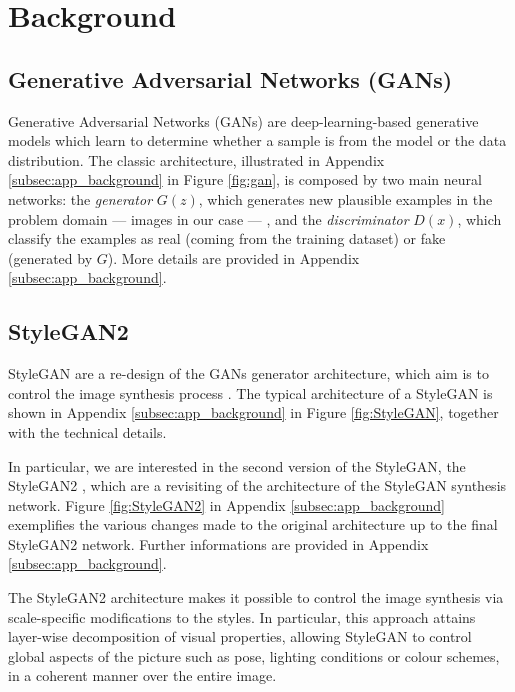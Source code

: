 \documentclass{article}
\begin{document}
	\section{Background}	
	
	\subsection{Generative Adversarial Networks (GANs)}\label{sec:gan}
	Generative Adversarial Networks (GANs) \cite{goodfellow2014generative} are deep-learning-based 
	generative models which learn to determine whether a sample is from the model or the data 
	distribution. 
	The classic architecture, illustrated in Appendix \ref{subsec:app_background} in Figure 
	\ref{fig:gan}, is 
	composed by two main neural networks: 
	the \textit{generator} ${G(z)}$, which generates new plausible examples in the problem domain — 
	images in our case — , and the \textit{discriminator} ${D(x)}$, which classify the examples as 
	real (coming from the training dataset) or fake (generated by $G$). More details are provided in 
	Appendix \ref{subsec:app_background}.
	
	\subsection{StyleGAN2}\label{sec:StyleGAN}
	StyleGAN are a re-design of the GANs generator architecture, which aim is to control the image 
	synthesis process \cite{karras2019style}. The typical architecture of a StyleGAN is shown in 
	Appendix \ref{subsec:app_background} in Figure \ref{fig:StyleGAN}, together with the technical 
	details. 
	
	In particular, we are interested in the second version of the StyleGAN, the StyleGAN2 
	\cite{karras2020analyzing}, which are a revisiting of the architecture of the StyleGAN synthesis 
	network. Figure \ref{fig:StyleGAN2} in Appendix \ref{subsec:app_background} exemplifies the 
	various changes made to the original architecture up to the final StyleGAN2 network. Further 
	informations are provided in Appendix \ref{subsec:app_background}.
	
	The StyleGAN2 architecture makes it possible to control the image synthesis via scale-specific 
	modifications to the styles. In particular, this approach attains layer-wise decomposition of visual 
	properties, allowing StyleGAN to control global aspects of the picture such as pose, lighting 
	conditions or colour schemes, in a coherent manner over the entire image.
	
\end{document}
